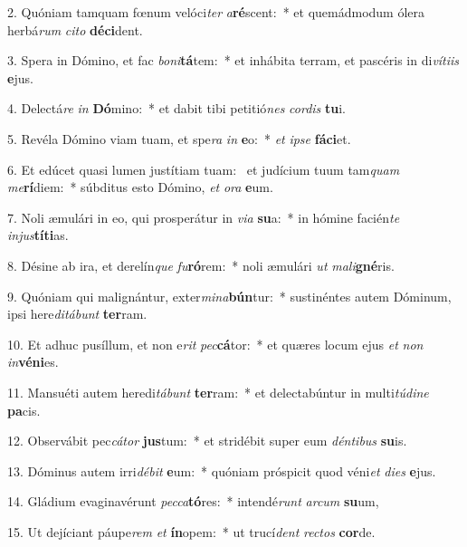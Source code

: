 2. Quóniam tamquam fœnum velóci\textit{ter} \textit{a}\textbf{ré}scent:~*  et quemádmodum ólera herbá\textit{rum} \textit{ci}\textit{to} \textbf{dé}\textbf{ci}dent.\

3. Spera in Dómino, et fac \textit{bo}\textit{ni}\textbf{tá}tem:~*  et inhábita terram, et pascéris in di\textit{ví}\textit{ti}\textit{is} \textbf{e}jus.\

4. Delectá\textit{re} \textit{in} \textbf{Dó}mino:~*  et dabit tibi petitió\textit{nes} \textit{cor}\textit{dis} \textbf{tu}i.\

5. Revéla Dómino viam tuam, et spe\textit{ra} \textit{in} \textbf{e}o:~*  \textit{et} \textit{ip}\textit{se} \textbf{fá}\textbf{ci}et.\

6. Et edúcet quasi lumen justítiam tuam: \dag\  et judícium tuum tam\textit{quam} \textit{me}\textbf{rí}diem:~*  súbditus esto Dómino, \textit{et} \textit{o}\textit{ra} \textbf{e}um.\

7. Noli æmulári in eo, qui prosperátur in \textit{vi}\textit{a} \textbf{su}a:~*  in hómine facién\textit{te} \textit{in}\textit{jus}\textbf{tí}\textbf{ti}as.\

8. Désine ab ira, et derelín\textit{que} \textit{fu}\textbf{ró}rem:~*  noli æmulári \textit{ut} \textit{ma}\textit{li}\textbf{gné}ris.\

9. Quóniam qui malignántur, exter\textit{mi}\textit{na}\textbf{bún}tur:~*  sustinéntes autem Dóminum, ipsi here\textit{di}\textit{tá}\textit{bunt} \textbf{ter}ram.\

10. Et adhuc pusíllum, et non e\textit{rit} \textit{pec}\textbf{cá}tor:~*  et quæres locum ejus \textit{et} \textit{non} \textit{in}\textbf{vé}\textbf{ni}es.\

11. Mansuéti autem heredi\textit{tá}\textit{bunt} \textbf{ter}ram:~*  et delectabúntur in multi\textit{tú}\textit{di}\textit{ne} \textbf{pa}cis.\

12. Observábit pec\textit{cá}\textit{tor} \textbf{jus}tum:~*  et stridébit super eum \textit{dén}\textit{ti}\textit{bus} \textbf{su}is.\

13. Dóminus autem irri\textit{dé}\textit{bit} \textbf{e}um:~*  quóniam próspicit quod véni\textit{et} \textit{di}\textit{es} \textbf{e}jus.\

14. Gládium evaginavérunt \textit{pec}\textit{ca}\textbf{tó}res:~*  intendé\textit{runt} \textit{ar}\textit{cum} \textbf{su}um,\

15. Ut dejíciant páupe\textit{rem} \textit{et} \textbf{ín}opem:~*  ut trucí\textit{dent} \textit{rec}\textit{tos} \textbf{cor}de.\

